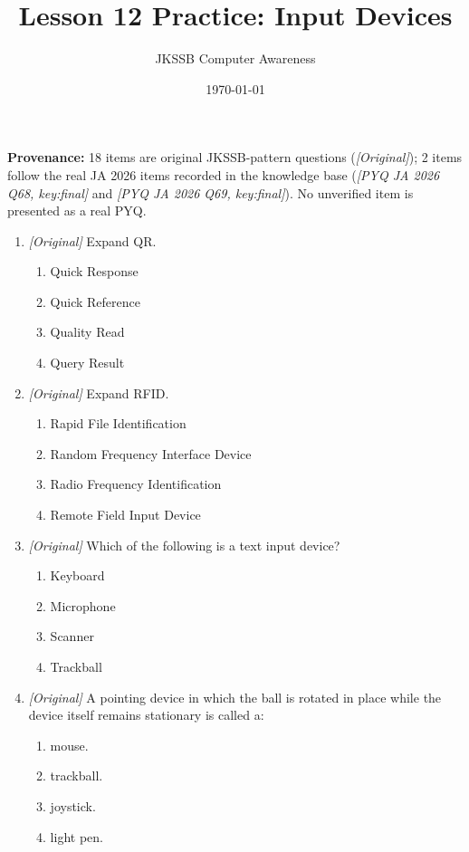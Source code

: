 \documentclass[11pt]{article}
\title{Lesson 12 Practice: Input Devices}
\author{JKSSB Computer Awareness}
\date{\today}
\begin{document}
\maketitle
\noindent\textbf{Provenance:} 18 items are original JKSSB-pattern questions
(\textit{[Original]}); 2 items follow the real JA 2026 items recorded in the
knowledge base (\textit{[PYQ JA 2026 Q68, key:final]} and
\textit{[PYQ JA 2026 Q69, key:final]}). No unverified item is presented as a
real PYQ.

\begin{enumerate}[label=\textbf{Q\arabic*.}, leftmargin=*]
\item \textit{[Original]} Expand QR.
  \begin{enumerate}[label=\Alph*.]
    \item Quick Response
    \item Quick Reference
    \item Quality Read
    \item Query Result
  \end{enumerate}
\item \textit{[Original]} Expand RFID.
  \begin{enumerate}[label=\Alph*.]
    \item Rapid File Identification
    \item Random Frequency Interface Device
    \item Radio Frequency Identification
    \item Remote Field Input Device
  \end{enumerate}
\item \textit{[Original]} Which of the following is a text input device?
  \begin{enumerate}[label=\Alph*.]
    \item Keyboard
    \item Microphone
    \item Scanner
    \item Trackball
  \end{enumerate}
\item \textit{[Original]} A pointing device in which the ball is rotated in
  place while the device itself remains stationary is called a:
  \begin{enumerate}[label=\Alph*.]
    \item mouse.
    \item trackball.
    \item joystick.
    \item light pen.
  \end{enumerate}

\end{enumerate}
\end{document}
